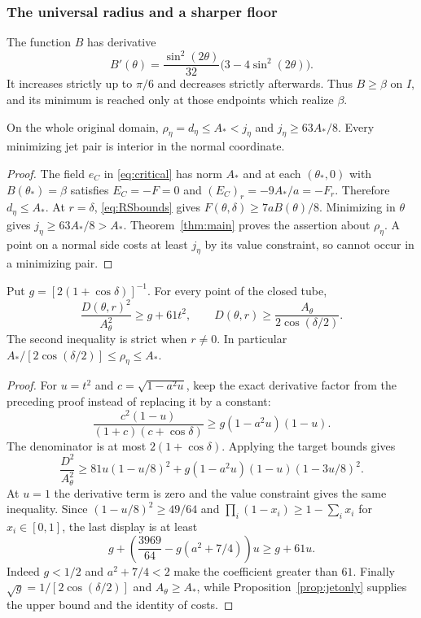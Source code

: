 \documentclass[11pt,a4paper]{article}
\begin{document}
\subsubsection{The universal radius and a sharper floor}
The function $B$ has derivative
\begin{equation}\label{eq:Bprime}
 B'(\theta)=\frac{\sin^2(2\theta)}{32}
                 \bigl(3-4\sin^2(2\theta)\bigr).
\end{equation}
It increases strictly up to $\pi/6$ and decreases strictly afterwards.
Thus $B\ge\beta$ on $I$, and its minimum is reached only at those
endpoints which realize $\beta$.

\begin{proposition}\label{prop:jetonly}
On the whole original domain,
$\rho_\eta=d_\eta\le A_*<j_\eta$ and $j_\eta\ge63A_*/8$.
Every minimizing jet pair is interior in the normal coordinate.
\end{proposition}
\begin{proof}
The field $e_C$ in \eqref{eq:critical} has norm $A_*$ and
at each $(\theta_*,0)$ with $B(\theta_*)=\beta$ satisfies
$E_C=-F=0$ and $(E_C)_r=-9A_*/a=-F_r$.
Therefore $d_\eta\le A_*$. At $r=\delta$,
\eqref{eq:RSbounds} gives $F(\theta,\delta)\ge7aB(\theta)/8$.
Minimizing in $\theta$ gives $j_\eta\ge63A_*/8>A_*$.
Theorem~\ref{thm:main} proves the assertion about $\rho_\eta$.
A point on a normal side costs at least $j_\eta$ by its value
constraint, so cannot occur in a minimizing pair.
\end{proof}

\begin{proposition}\label{prop:strongfloor}
Put $g=[2(1+\cos\delta)]^{-1}$. For every point of the closed tube,
\begin{equation}\label{eq:strongfloor}
 \frac{D(\theta,r)^2}{A_\theta^2}\ge g+61t^2,\qquad
 D(\theta,r)\ge\frac{A_\theta}{2\cos(\delta/2)}.
\end{equation}
The second inequality is strict when $r\ne0$. In particular
$A_*/[2\cos(\delta/2)]\le\rho_\eta\le A_*$.
\end{proposition}
\begin{proof}
For $u=t^2$ and $c=\sqrt{1-a^2u}$, keep the exact derivative
factor from the preceding proof instead of replacing it by a constant:
\[
 \frac{c^2(1-u)}{(1+c)(c+\cos\delta)}
 \ge g(1-a^2u)(1-u).
\]
The denominator is at most $2(1+\cos\delta)$. Applying the target
bounds gives
\[
 \frac{D^2}{A_\theta^2}\ge
 81u(1-u/8)^2+
       g(1-a^2u)(1-u)(1-3u/8)^2.
\]
At $u=1$ the derivative term is zero and the value constraint gives
the same inequality. Since $(1-u/8)^2\ge49/64$ and
$\prod_i(1-x_i)\ge1-\sum_i x_i$ for $x_i\in[0,1]$, the last
display is at least
\[
 g+\left(\frac{3969}{64}-g(a^2+7/4)\right)u\ge g+61u.
\]
Indeed $g<1/2$ and $a^2+7/4<2$ make the coefficient greater
than $61$. Finally $\sqrt g=1/[2\cos(\delta/2)]$ and
$A_\theta\ge A_*$, while Proposition~\ref{prop:jetonly} supplies
the upper bound and the identity of costs.
\end{proof}
\end{document}
